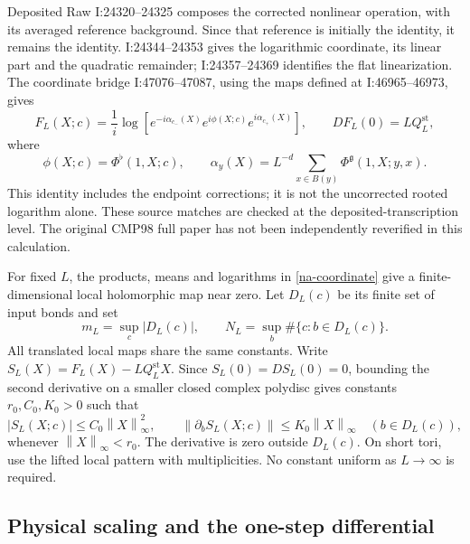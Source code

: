\documentclass[11pt]{article}
\theoremstyle{remark}
\newcommand{\norm}[1]{\left\|#1\right\|}
\begin{document}
Deposited Raw I:24320--24325 composes the corrected nonlinear
operation, with its averaged reference background. Since that
reference is initially the identity, it remains the identity.
I:24344--24353 gives the logarithmic coordinate, its linear part and
the quadratic remainder; I:24357--24369 identifies the flat
linearization. The coordinate bridge I:47076--47087, using the maps
defined at I:46965--46973, gives
\begin{equation}
 F_L(X;c)=\frac1i\log\left[
  e^{-i\alpha_{c_-}(X)}e^{i\phi(X;c)}e^{i\alpha_{c_+}(X)}\right],
 \qquad DF_L(0)=LQ_L^{\mathrm{st}},
 \label{na-coordinate}
\end{equation}
where
\[
 \phi(X;c)=\Phi^{\flat}(1,X;c),\qquad
 \alpha_y(X)=L^{-d}\sum_{x\in B(y)}\Phi^{\mathfrak g}(1,X;y,x).
\]
This identity includes the endpoint corrections; it is not the
uncorrected rooted logarithm alone. These source matches are checked
at the deposited-transcription level. The original CMP98 full paper
has not been independently reverified in this calculation.

For fixed $L$, the products, means and logarithms in
\eqref{na-coordinate} give a finite-dimensional local holomorphic
map near zero. Let $D_L(c)$ be its finite set of input bonds and set
\[
 m_L=\sup_c|D_L(c)|,\qquad
 N_L=\sup_b\#\{c:b\in D_L(c)\}.
\]
All translated local maps share the same constants. Write
$S_L(X)=F_L(X)-LQ_L^{\mathrm{st}}X$. Since
$S_L(0)=DS_L(0)=0$, bounding the second derivative on a smaller
closed complex polydisc gives constants $r_0,C_0,K_0>0$ such that
\begin{equation}
 |S_L(X;c)|\le C_0\norm{X}_\infty^2,
 \qquad
 \norm{\partial_bS_L(X;c)}\le K_0\norm{X}_\infty
 \quad (b\in D_L(c)),
 \label{na-local-jet-bounds}
\end{equation}
whenever $\norm{X}_\infty<r_0$. The derivative is zero outside
$D_L(c)$. On short tori, use the lifted local pattern with
multiplicities. No constant uniform as $L\to\infty$ is required.

\subsection{Physical scaling and the one-step differential}
\label{na-one-step}
\end{document}
